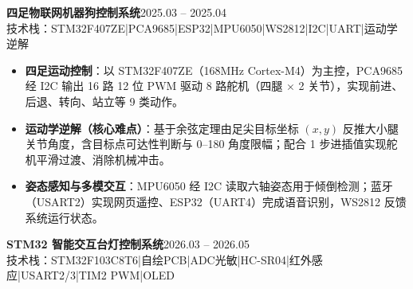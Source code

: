 \documentclass[10pt,a4paper]{article}
\newcommand{\projectblock}[3]{%
    {\bfseries\color{darktext}#1}\hfill{\color{graytext}#2}\\%
    {\small\color{graytext}#3}%
    \vspace{0.2em}%
}
\begin{document}
\projectblock{四足物联网机器狗控制系统}{2025.03 -- 2025.04}{技术栈：STM32F407ZE\hspace{0.3em}|\hspace{0.3em}PCA9685\hspace{0.3em}|\hspace{0.3em}ESP32\hspace{0.3em}|\hspace{0.3em}MPU6050\hspace{0.3em}|\hspace{0.3em}WS2812\hspace{0.3em}|\hspace{0.3em}I2C\hspace{0.3em}|\hspace{0.3em}UART\hspace{0.3em}|\hspace{0.3em}运动学逆解}

\begin{itemize}[leftmargin=1.5em, itemsep=2pt, parsep=0pt, topsep=2pt]
    \item \textbf{四足运动控制}：以 STM32F407ZE（168MHz Cortex-M4）为主控，PCA9685 经 I2C 输出 16 路 12 位 PWM 驱动 8 路舵机（四腿 $\times$ 2 关节），实现前进、后退、转向、站立等 9 类动作。
    \item \textbf{运动学逆解（核心难点）}：基于余弦定理由足尖目标坐标 $(x, y)$ 反推大小腿关节角度，含目标点可达性判断与 0\textdegree--180\textdegree{} 角度限幅；配合 1\textdegree{} 步进插值实现舵机平滑过渡、消除机械冲击。
    \item \textbf{姿态感知与多模交互}：MPU6050 经 I2C 读取六轴姿态用于倾倒检测；蓝牙（USART2）实现网页遥控、ESP32（UART4）完成语音识别，WS2812 反馈系统运行状态。
\end{itemize}

\vspace{0.12em}

\projectblock{STM32 智能交互台灯控制系统}{2026.03 -- 2026.05}{技术栈：STM32F103C8T6\hspace{0.3em}|\hspace{0.3em}自绘PCB\hspace{0.3em}|\hspace{0.3em}ADC光敏\hspace{0.3em}|\hspace{0.3em}HC-SR04\hspace{0.3em}|\hspace{0.3em}红外感应\hspace{0.3em}|\hspace{0.3em}USART2/3\hspace{0.3em}|\hspace{0.3em}TIM2 PWM\hspace{0.3em}|\hspace{0.3em}OLED}
\end{document}
